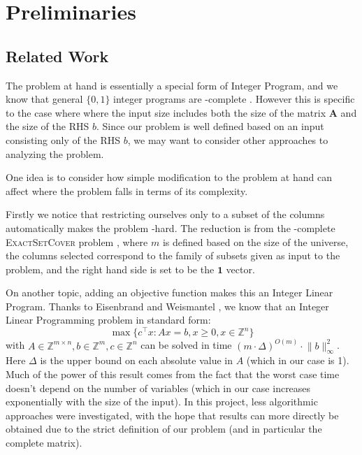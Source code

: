 \documentclass{article}
\newcommand\norm[1]{\lVert#1\rVert}
\begin{document}
\section{Preliminaries}
\subsection{Related Work}
The problem at hand is essentially a special form of Integer Program, and we know that general $ \{0,1\} $ integer programs\footnotemark{} are \NP-complete \cite{Karp1972}. However this is specific to the case where where the input size includes both the size of the matrix $ \mathbf{A} $ and the size of the RHS $ b $. Since our problem is well defined based on an input consisting only of the RHS $ b $, we may want to consider other approaches to analyzing the problem. 

One idea is to consider how simple modification to the problem at hand can affect where the problem falls in terms of its complexity. 

Firstly we notice that restricting ourselves only to a subset of the columns automatically makes the problem \NP-hard. The reduction is from the \NP-complete \textsc{ExactSetCover} problem \cite{Kozen1992}, where $m$ is defined based on the size of the universe, the columns selected correspond to the family of subsets given as input to the problem, and the right hand side is set to be the $\mathbf{1}$ vector.

On another topic, adding an objective function makes this an Integer Linear Program. Thanks to Eisenbrand and Weismantel \cite{Eisenbrand:277936}, we know that an Integer Linear Programming problem in standard form:
 \[ \max\{c^\top x: Ax = b, x \geq 0, x \in \mathbb{Z}^n\} \]
  with $ A \in  \mathbb{Z}^{m \times n}, b \in \mathbb{Z}^m, c \in \mathbb{Z}^n$ can be solved in time $ (m \cdot \Delta)^{O(m)}\cdot \norm{b}_\infty^2 $. Here $ \Delta $ is the upper bound on each absolute value in $ A $ (which in our case is 1). Much of the power of this result comes from the fact that the worst case time doesn't depend on the number of variables (which in our case increases exponentially with the size of the input). In this project, less algorithmic approaches were investigated, with the hope that results can more directly be obtained due to the strict definition of our problem (and in particular the complete matrix).
\end{document}
